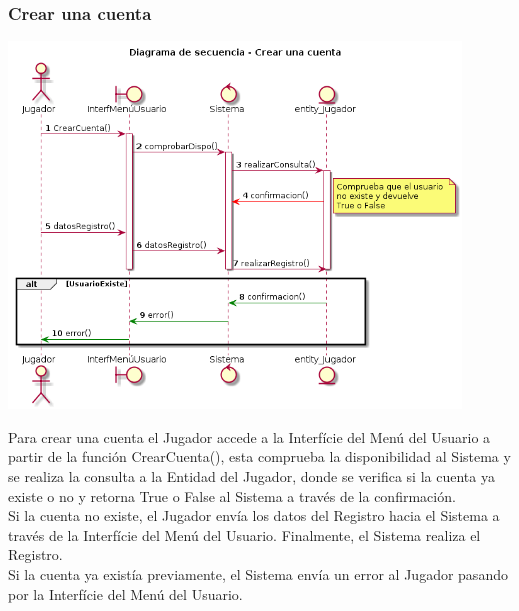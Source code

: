\subsubsection{Crear una cuenta}
\begin{center}
  \includegraphics[width=0.9\textwidth]{./imatges/jugador/Crear_una_cuenta.png}
  \end{center}
  Para crear una cuenta el Jugador accede a la Interfície del Menú del Usuario a partir de la función CrearCuenta(), esta comprueba la disponibilidad al Sistema y se realiza la consulta a la Entidad del Jugador, donde se verifica si la cuenta ya existe o no y retorna True o False al Sistema a través de la confirmación.
  \\Si la cuenta no existe, el Jugador envía los datos del Registro hacia el Sistema a través de la Interfície del Menú del Usuario. Finalmente, el Sistema realiza el Registro.
  \\Si la cuenta ya existía previamente, el Sistema envía un error al Jugador pasando por la Interfície del Menú del Usuario.
  
